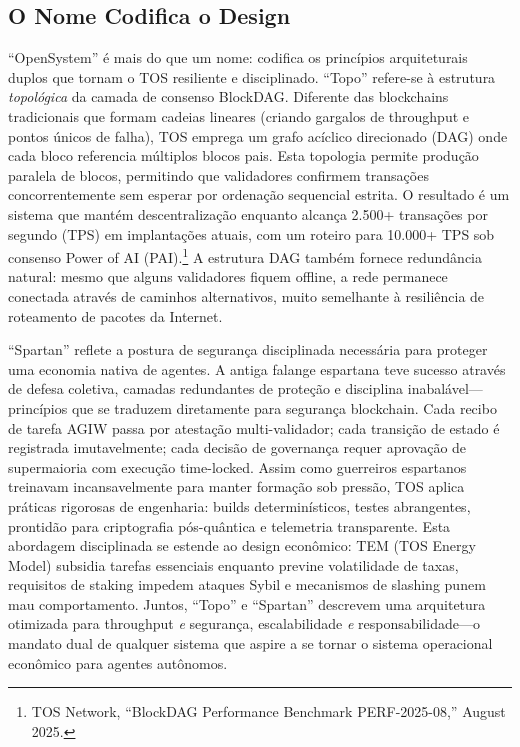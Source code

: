 \documentclass[11pt]{article}
\begin{document}
\subsection{O Nome Codifica o Design}
``OpenSystem'' é mais do que um nome: codifica os princípios arquiteturais duplos que tornam o TOS resiliente e disciplinado. ``Topo'' refere-se à estrutura \emph{topológica} da camada de consenso BlockDAG. Diferente das blockchains tradicionais que formam cadeias lineares (criando gargalos de throughput e pontos únicos de falha), TOS emprega um grafo acíclico direcionado (DAG) onde cada bloco referencia múltiplos blocos pais. Esta topologia permite produção paralela de blocos, permitindo que validadores confirmem transações concorrentemente sem esperar por ordenação sequencial estrita. O resultado é um sistema que mantém descentralização enquanto alcança 2.500+ transações por segundo (TPS) em implantações atuais, com um roteiro para 10.000+ TPS sob consenso Power of AI (PAI).\footnote{TOS Network, ``BlockDAG Performance Benchmark PERF-2025-08,'' August 2025.} A estrutura DAG também fornece redundância natural: mesmo que alguns validadores fiquem offline, a rede permanece conectada através de caminhos alternativos, muito semelhante à resiliência de roteamento de pacotes da Internet.

``Spartan'' reflete a postura de segurança disciplinada necessária para proteger uma economia nativa de agentes. A antiga falange espartana teve sucesso através de defesa coletiva, camadas redundantes de proteção e disciplina inabalável---princípios que se traduzem diretamente para segurança blockchain. Cada recibo de tarefa AGIW passa por atestação multi-validador; cada transição de estado é registrada imutavelmente; cada decisão de governança requer aprovação de supermaioria com execução time-locked. Assim como guerreiros espartanos treinavam incansavelmente para manter formação sob pressão, TOS aplica práticas rigorosas de engenharia: builds determinísticos, testes abrangentes, prontidão para criptografia pós-quântica e telemetria transparente. Esta abordagem disciplinada se estende ao design econômico: TEM (TOS Energy Model) subsidia tarefas essenciais enquanto previne volatilidade de taxas, requisitos de staking impedem ataques Sybil e mecanismos de slashing punem mau comportamento. Juntos, ``Topo'' e ``Spartan'' descrevem uma arquitetura otimizada para throughput \emph{e} segurança, escalabilidade \emph{e} responsabilidade---o mandato dual de qualquer sistema que aspire a se tornar o sistema operacional econômico para agentes autônomos.
\end{document}
